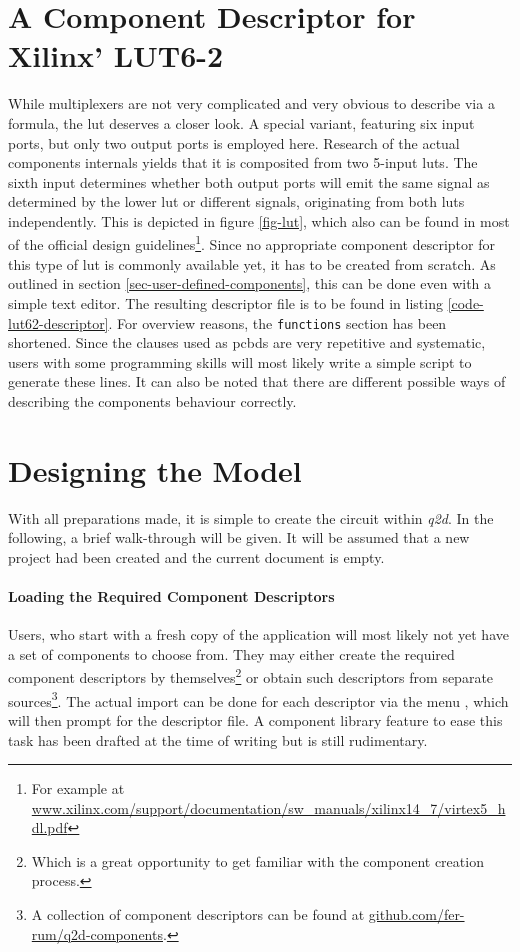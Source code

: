 \section{A Component Descriptor for Xilinx' LUT6-2}
	\label{sec-xilinx-lut}
	While multiplexers are not very complicated and very obvious to describe via a formula, the \gls{lut} deserves a closer look.
	A special variant, featuring six input ports, but only two output ports is employed here.
	Research of the actual components internals yields that it is composited from two 5-input \glspl{lut}.
	The sixth input determines whether both output ports will emit the same signal as determined by the lower \gls{lut} or different signals, originating from both \glspl{lut} independently. 
	This is depicted in figure \ref{fig-lut}, which also can be found in most of the official design guidelines\footnote{
		For example at \url{www.xilinx.com/support/documentation/sw_manuals/xilinx14_7/virtex5_hdl.pdf}	
	}\cite{hdl-guide}.
	Since no appropriate component descriptor for this type of \gls{lut} is commonly available yet, it has to be created from scratch.
	As outlined in section \ref{sec-user-defined-components}, this can be done even with a simple text editor.
	The resulting descriptor file is to be found in listing \ref{code-lut62-descriptor}.
	For overview reasons, the \texttt{functions} section has been shortened. 
	Since the clauses used as \glspl{pcbd} are very repetitive and systematic, users with some programming skills will most likely write a simple script to generate these lines.
	It can also be noted that there are different possible ways of describing the components behaviour correctly.
	

\section{Designing the Model}
	With all preparations made, it is simple to create the circuit within \emph{q2d}.
	In the following, a brief walk-through will be given.
	It will be assumed that a new project had been created and the current document is empty.
	
	\paragraph{Loading the Required Component Descriptors}
	Users, who start with a fresh copy of the application will most likely not yet have a set of components to choose from.
	They may either create the required component descriptors by themselves\footnote{
		Which is a great opportunity to get familiar with the component creation process.
	} or obtain such descriptors from separate sources\footnote{
		A collection of component descriptors can be found at \url{github.com/fer-rum/q2d-components}. 	
	}.
	The actual import can be done for each descriptor via the menu , which will then prompt for the descriptor file.
	 A component library feature to ease this task has been drafted at the time of writing but is still rudimentary.
	 
